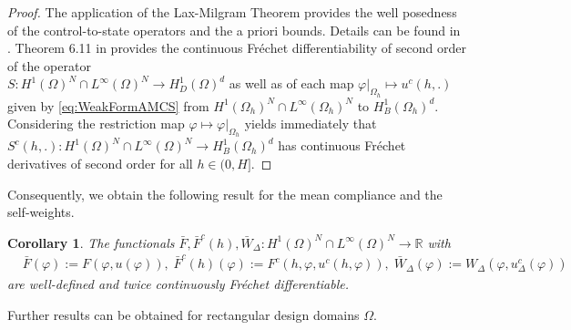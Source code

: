 \documentclass[a4paper,11pt]{article}
\newtheorem{corollary}{Corollary}
\theoremstyle{remark}
\newcommand{\R}{\mathbb{R}}
\newcommand{\HON}{H^1(\Omega)^N }
\newcommand{\LinfN}{L^\infty(\Omega)^N}
\begin{document}
\begin{proof}
The application of the Lax-Milgram Theorem provides the well posedness
of the control-to-state operators and the a priori bounds. Details can be found in \cite{BFGS14}.
Theorem 6.11 in \cite{DissRupprecht} provides the continuous Fr\'echet differentiability of second order of the operator\\
 $S:\HON \cap \LinfN \rightarrow H^1_D(\Omega)^d $ as well as of each map $\varphi|_{\Omega_h} \mapsto u^c(h,.)$ given by \eqref{eq:WeakFormAMCS} from $ H^1(\Omega_h)^N\cap L^\infty(\Omega_h)^N$ to $H^1_B(\Omega_{h})^d$.
Considering the restriction map $\varphi \mapsto \varphi|_{\Omega_h}$ yields immediately that $S^c(h,.):\HON \cap \LinfN \rightarrow  H^1_B(\Omega_{h})^d $
has continuous Fr\'echet derivatives of second order for all $h\in (0,H]$.
\end{proof}
Consequently,
  we obtain the following result for the mean compliance and the self-weights.
\begin{corollary}
The functionals $\bar F, 
\bar F^c(h),
\bar W_\Delta: \HON \cap \LinfN \rightarrow \R$ with 
\begin{align}
\label{FcDelta}
&\bar F(\varphi):=
F(\varphi, u(\varphi))
,                    \; %
\bar F^c(h) (\varphi):=
F^c(h, \varphi, u^c(h,\varphi))
,                  \;
\bar W_\Delta(\varphi):=
W_\Delta(\varphi, u^c_\Delta(\varphi))
\end{align}
are well-defined and twice
continuously Fréchet differentiable.
\end{corollary}

Further results can be obtained for rectangular design domains $\Omega $. 
\end{document}
